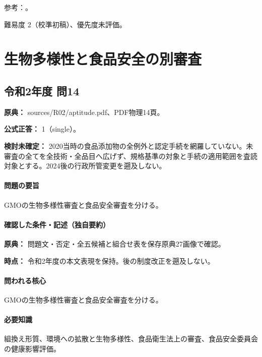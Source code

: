 \par 参考：\cite{env_renewable2022,env_hydrogen2015,env_biomass,env_paris}。

\par 難易度 2（校準初稿）、優先度未評価。

\section{生物多様性と食品安全の別審査}

\subsection{令和2年度 問14}
\label{q:r02-reg-apt-14}

\noindent\textbf{原典：} sources/R02/aptitude.pdf、PDF物理14頁。

\textbf{公式正答：} 1（single）。

\par\textbf{検討未確定：} 2020当時の食品添加物の全例外と認定手続を網羅していない。未審査の全てを全技術・全品目へ広げず、規格基準の対象と手続の適用範囲を査読対象とする。2024後の行政所管変更を遡及しない。

\paragraph{問題の要旨} GMOの生物多様性審査と食品安全審査を分ける。

\paragraph{確認した条件・記述（独自要約）}\mbox{}\par

\noindent\textbf{原典：} 問題文・否定・全五候補と組合せ表を保存原典27画像で確認。\par

\noindent\textbf{時点：} 令和2年度の本文表現を保持。後の制度改正を遡及しない。\par

\paragraph{問われる核心} GMOの生物多様性審査と食品安全審査を分ける。

\paragraph{必要知識} 組換え形質、環境への拡散と生物多様性、食品衛生法上の審査、食品安全委員会の健康影響評価。

